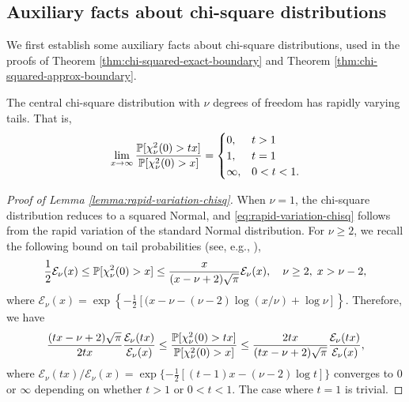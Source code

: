 




\subsection{Auxiliary facts about chi-square distributions}

We first establish some auxiliary facts about chi-square distributions, used in the proofs of Theorem \ref{thm:chi-squared-exact-boundary} and Theorem \ref{thm:chi-squared-approx-boundary}.

\begin{lemma} \label{lemma:rapid-variation-chisq}
The central chi-square distribution with $\nu$ degrees of freedom has rapidly varying tails.
That is, 
\begin{equation} \label{eq:rapid-variation-chisq}
    \lim_{x\to\infty}\frac{\P[\chi_\nu^2(0)>tx]}{\P[\chi_\nu^2(0)>x]} = 
    \begin{cases}
    0, & t > 1 \\
    1, & t = 1 \\
    \infty, & 0 < t < 1.
\end{cases}
\end{equation}
\end{lemma}

\begin{proof}[Proof of Lemma \ref{lemma:rapid-variation-chisq}]
When $\nu=1$, the chi-square distribution reduces to a squared Normal, and \eqref{eq:rapid-variation-chisq} follows from the rapid variation of the standard Normal distribution.
For $\nu\ge2$, we recall the following bound on tail probabilities (see, e.g., \citep{inglot2010inequalities}),
$$
\frac{1}{2}\mathcal{E}_\nu(x) \le \P[\chi_\nu^2(0)>x] \le \frac{x}{(x-\nu+2)\sqrt{\pi}} \mathcal{E}_\nu(x), \quad \nu\ge2,\;x>\nu-2,
$$
where $\mathcal{E}_\nu(x) = \exp\left\{-\frac{1}{2}[(x-\nu-(\nu-2)\log(x/\nu) + \log\nu]\right\}$.
Therefore, we have 
$$
\frac{(tx-\nu+2)\sqrt{\pi}}{2tx}\frac{\mathcal{E}_\nu(tx)}{\mathcal{E}_\nu(x)} 
\le \frac{\P[\chi_\nu^2(0)>tx]}{\P[\chi_\nu^2(0)>x]}
\le \frac{2tx}{(tx-\nu+2)\sqrt{\pi}}\frac{\mathcal{E}_\nu(tx)}{\mathcal{E}_\nu(x)},
$$
where ${\mathcal{E}_\nu(tx)}/{\mathcal{E}_\nu(x)} = \exp\{-\frac{1}{2}[(t-1)x-(\nu-2)\log{t}]\}$ converges to $0$ or $\infty$ depending on whether $t>1$ or $0<t<1$.
The case where $t=1$ is trivial.
\end{proof}

